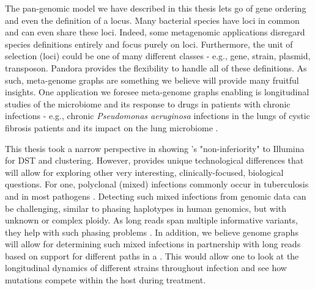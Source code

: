 \noindent
The pan-genomic model we have described in this thesis lets go of gene ordering and even the definition of a locus. Many bacterial species have loci in common and can even share these loci. Indeed, some metagenomic applications disregard species definitions entirely and focus purely on loci. Furthermore, the unit of selection (loci) could be one of many different classes - e.g., gene, strain, plasmid, transposon. Pandora provides the flexibility to handle all of these definitions. As such, meta-genome graphs are something we believe will provide many fruitful insights. One application we foresee meta-genome graphs enabling is longitudinal studies of the microbiome and its response to drugs in patients with chronic infections - e.g., chronic \textit{Pseudomonas aeruginosa} infections in the lungs of cystic fibrosis patients and its impact on the lung microbiome \cite{Boutin2017Chronic}.


\noindent
This thesis took a narrow perspective in showing \ont{}'s "non-inferiority" to Illumina for \mtb{} DST and clustering. However, \ont{} provides unique technological differences that will allow for exploring other very interesting, clinically-focused, biological questions. For one, polyclonal (mixed) infections commonly occur in tuberculosis \cite{Cohen2012} and in most pathogens \cite{Balmer2011}. Detecting such mixed infections from genomic data can be challenging, similar to phasing haplotypes in human genomics, but with unknown or complex ploidy. As long \ont{} reads span multiple informative variants, they help with such phasing problems \cite{Patterson2015WhatsHap}. In addition, we believe genome graphs will allow for determining such mixed infections in partnership with long reads based on support for different paths in a \prg{}. This would allow one to look at the longitudinal dynamics of different strains throughout infection and see how mutations compete within the host during treatment. 

